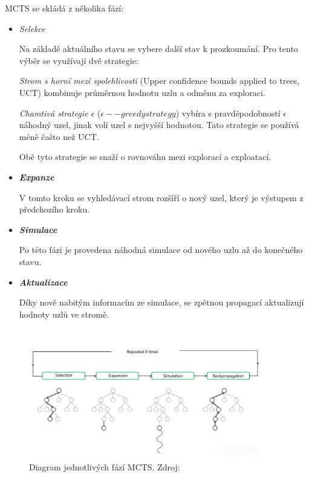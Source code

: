 MCTS se skládá z několika fází:
\begin{itemize}
  \item \emph{Selekce}

  Na základě aktuálního stavu se vybere další stav k prozkoumání.
  Pro tento výběr se využívají dvě strategie:
  
  \emph{Strom s horní mezí spolehlivosti} (Upper confidence bounds applied to trees, UCT) kombinuje průměrnou hodnotu uzlu a odměnu za exploraci.

  \label{epsilon_greedy}
  \emph{Chamtivá strategie $\epsilon$ } ($\epsilon--greedy strategy$) vybíra s pravděpodobností $\epsilon$ náhodný uzel, jinak volí uzel s nejvyšší hodnotou.
  Tato strategie se používá méně čašto než UCT\@.

  Obě tyto strategie se snaží o rovnováhu mezi explorací a exploatací.
  \item \textbf{\emph{Expanze}}

  V tomto kroku se vyhledávací strom rozšíří o nový uzel, který je výstupem z předchozího kroku.

  \item \textbf{\emph{Simulace}}

  Po této fázi je provedena náhodná simulace od nového uzlu až do konečného stavu.

  \item \textbf{\emph{Aktualizace}}
  
  Díky nově nabitým informacím ze simulace, se zpětnou propagací aktualizují hodnoty uzlů ve stromě.

\end{itemize}

\begin{figure}[H]
	\centering
	\includegraphics[width=0.9\textwidth]{obrazky-figures/mcts}
	\caption{Diagram jednotlivých fází MCTS.
  Zdroj:\cite{Monte_Carlo_Tree_Search}}\label{fig:mcts}
\end{figure}

